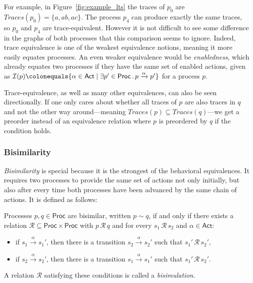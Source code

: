 For example, in Figure~\ref{fig:example_lts} the traces of $p_0$ are
$\mathit{Traces}(p_0) = \{a, ab, ac\}$.
The process $p_4$ can produce exactly the same traces,
so $p_0$ and $p_4$ are trace-equivalent.
However it is not difficult to see some difference in the graphs of both
processes that this comparison seems to ignore.
Indeed, trace equivalence is one of the weakest equivalence notions,
meaning it more easily equates processes.
An even weaker equivalence would be \emph{enabledness},
which already equates two processes
if they have the same set of enabled actions,
given as
$\mathcal{I}(p) \colonequals \{\alpha \in \mathsf{Act} \mid
    {\exists p' \in \mathsf{Proc}}\,.\,p \xrightarrow{\alpha} p'\}$
for a process $p$.

Trace-equivalence, as well as many other equivalences,
can also be seen directionally.
If one only cares about whether all traces of $p$ are also traces in $q$ and
not the other way around---meaning
$\mathit{Traces}(p) \subseteq \mathit{Traces}(q)$---we get a
preorder instead of an equivalence relation where $p$ is preordered by $q$
if the condition holds.


\subsubsection{Bisimilarity}

\emph{Bisimilarity} is special because it is the strongest of the behavioral
equivalences.
It requires two processes to provide the same set of actions not only initially,
but also after every time both processes have been advanced
by the same chain of actions.
It is defined as follows:

\begin{definition}\label{def:bisimulation}
    Processes $p, q \in \mathsf{Proc}$ are bisimilar, written $p \sim q$,
    if and only if there exists a relation
    $\mathcal{R} \subseteq \mathsf{Proc} \times \mathsf{Proc}$
    with $p\, \mathcal{R}\, q$ and for every $s_1\, \mathcal{R}\, s_2$ and
    $\alpha \in \mathsf{Act}$:
    \begin{itemize}
        \item if $s_1 \xrightarrow{\alpha} s_1'$, then there is a transition
            $s_2 \xrightarrow{\alpha} s_2'$ such that $s_1'\, \mathcal{R}\, s_2'$,
        \item if $s_2 \xrightarrow{\alpha} s_2'$, then there is a transition
            $s_1 \xrightarrow{\alpha} s_1'$ such that $s_1'\, \mathcal{R}\, s_2'$.
    \end{itemize}
    A relation $\mathcal{R}$ satisfying these conditions is called a
    \emph{bisimulation}.
\end{definition}

